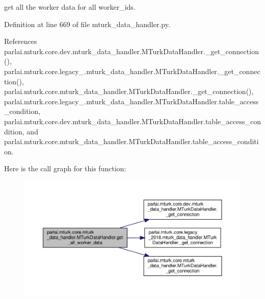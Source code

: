 \begin{DoxyVerb}get all the worker data for all worker_ids.\end{DoxyVerb}
 

Definition at line 669 of file mturk\+\_\+data\+\_\+handler.\+py.



References parlai.\+mturk.\+core.\+dev.\+mturk\+\_\+data\+\_\+handler.\+M\+Turk\+Data\+Handler.\+\_\+get\+\_\+connection(), parlai.\+mturk.\+core.\+legacy\+\_.\+mturk\+\_\+data\+\_\+handler.\+M\+Turk\+Data\+Handler.\+\_\+get\+\_\+connection(), parlai.\+mturk.\+core.\+mturk\+\_\+data\+\_\+handler.\+M\+Turk\+Data\+Handler.\+\_\+get\+\_\+connection(), parlai.\+mturk.\+core.\+legacy\+\_.\+mturk\+\_\+data\+\_\+handler.\+M\+Turk\+Data\+Handler.\+table\+\_\+access\+\_\+condition, parlai.\+mturk.\+core.\+dev.\+mturk\+\_\+data\+\_\+handler.\+M\+Turk\+Data\+Handler.\+table\+\_\+access\+\_\+condition, and parlai.\+mturk.\+core.\+mturk\+\_\+data\+\_\+handler.\+M\+Turk\+Data\+Handler.\+table\+\_\+access\+\_\+condition.

Here is the call graph for this function\+:
\nopagebreak
\begin{figure}[H]
\begin{center}
\leavevmode
\includegraphics[width=350pt]{classparlai_1_1mturk_1_1core_1_1mturk__data__handler_1_1MTurkDataHandler_a188c46e50f06129a289a065809290bf3_cgraph}
\end{center}
\end{figure}
\mbox{\label{classparlai_1_1mturk_1_1core_1_1mturk__data__handler_1_1MTurkDataHandler_ab41299fc55cf09e4d0921aac63889a86}} 

